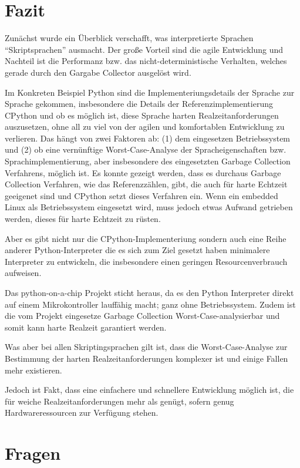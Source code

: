 \section{Fazit}


Zunächst wurde ein Überblick verschafft, was interpretierte Sprachen
“Skriptsprachen” ausmacht. Der große Vorteil sind die agile Entwicklung und
Nachteil ist die Performanz bzw. das nicht-deterministische Verhalten, welches
gerade durch den Gargabe Collector ausgelöst wird.

Im Konkreten Beispiel Python sind die Implementeriungsdetails der Sprache zur
Sprache gekommen, insbesondere die Details der Referenzimplementierung CPython
und ob es möglich ist, diese Sprache harten Realzeitanforderungen auszusetzen,
ohne all zu viel von der agilen und komfortablen Entwicklung zu verlieren.
Das hängt von zwei Faktoren ab: (1) dem eingesetzen Betriebssystem und (2) ob
eine vernünftige Worst-Case-Analyse der Spracheigenschaften bzw.
Sprachimplementierung, aber insbesondere des eingesetzten Garbage Collection
Verfahrens, möglich ist. Es konnte gezeigt werden, dass es durchaus Garbage Collection
Verfahren, wie das Referenzzählen, gibt, die auch für harte Echtzeit geeigenet
sind und CPython setzt dieses Verfahren ein. Wenn ein embedded Linux als
Betriebssystem eingesetzt wird, muss jedoch etwas Aufwand getrieben werden,
dieses für harte Echtzeit zu rüsten.

Aber es gibt nicht nur die CPython-Implementeriung sondern auch eine Reihe
anderer Python-Interpreter die es sich zum Ziel gesetzt haben minimalere
Interpreter zu entwickeln, die insbesondere einen geringen Resourcenverbrauch
aufweisen.

Das python-on-a-chip Projekt sticht heraus, da es den Python Interpreter
direkt auf einem Mikrokontroller lauffähig macht; ganz ohne Betriebssystem.
Zudem ist die vom Projekt eingesetze Garbage Collection
Worst-Case-analysierbar und somit kann harte Realzeit garantiert werden.

Was aber bei allen Skriptingsprachen gilt ist, dass die Worst-Case-Analyse
zur Bestimmung der harten Realzeitanforderungen komplexer ist und einige
Fallen mehr existieren.

Jedoch ist Fakt, dass eine einfachere und schnellere Entwicklung möglich ist,
die für weiche Realzeitanforderungen mehr als genügt, sofern genug
Hardware\-ressourcen zur Verfügung stehen.


\newpage
\section{Fragen}


